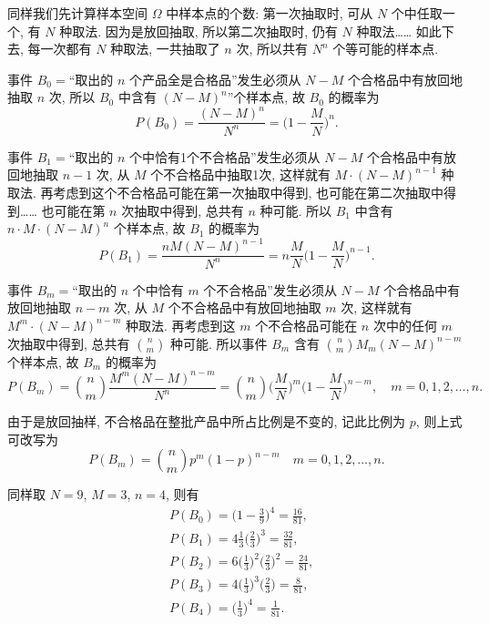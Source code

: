 \begin{solution}
  同样我们先计算样本空间 $\Omega$ 中样本点的个数:
  第一次抽取时,
  可从 $N$ 个中任取一个,
  有 $N$ 种取法.
  因为是放回抽取,
  所以第二次抽取时,
  仍有 $N$ 种取法……
  如此下去,
  每一次都有 $N$ 种取法,
  一共抽取了 $n$ 次,
  所以共有 $N ^n$ 个等可能的样本点.

  事件 $B _0=$“取出的 $n$ 个产品全是合格品”发生必须从 $N - M$ 个合格品中有放回地抽取 $n$ 次,
  所以 $B _0$ 中含有 $(N - M) ^n$”个样本点,
  故 $B _0$ 的概率为
  \[
    P ( B _0 ) = \frac{(N - M)^n}{N ^n} = \biggl( 1 - \frac{M}{N} \biggr) ^n.
  \]

  事件 $B _1=$“取出的 $n$ 个中恰有1个不合格品”发生必须从 $N - M$ 个合格品中有放回地抽取 $n - 1$ 次,
  从 $M$ 个不合格品中抽取1次,
  这样就有 $M \cdot (N - M) ^{n - 1}$ 种取法.
  再考虑到这个不合格品可能在第一次抽取中得到,
  也可能在第二次抽取中得到……
  也可能在第 $n$ 次抽取中得到,
  总共有 $n$ 种可能.
  所以 $B _1$ 中含有 $n \cdot M \cdot (N - M) ^n$ 个样本点,
  故 $B _1$ 的概率为
  \[
    P (B _1) = \frac{nM (N - M) ^{n - 1}}{N ^n} = n \frac{M}{N} \biggl( 1 - \frac{M}{N} \biggr) ^{n - 1}.
  \]

  事件 $B _m =$“取出的 $n$ 个中恰有 $m$ 个不合格品”发生必须从 $N - M$ 个合格品中有放回地抽取 $n - m$ 次,
  从 $M$ 个不合格品中有放回地抽取 $m$ 次,
  这样就有 $M^m \cdot (N - M) ^{n - m}$ 种取法.
  再考虑到这 $m$ 个不合格品可能在 $n$ 次中的任何 $m$ 次抽取中得到,
  总共有 $\binom{n}{m}$ 种可能.
  所以事件 $B _m$ 含有 $\binom{n}{m} M _m (N - M) ^{n - m}$ 个样本点,
  故 $B _m$ 的概率为
  \begin{equation}
    P (B _m) = \binom{n}{m} \frac{M ^m (N - M)^{n - m}}{N ^n}
    = \binom{n}{m} \biggl( \frac{M}{N} \biggr) ^m \biggl( 1 - \frac{M}{N} \biggr) ^{n - m},
    \quad m = 0, 1, 2, \dotsc, n.\label{eq1.2.7}
  \end{equation}

  由于是放回抽样,
  不合格品在整批产品中所占比例是不变的,
  记此比例为 $p$,
  则上式可改写为
  \[
    P (B _m) = \binom{n}{m} p ^m (1 - p) ^{n - m} \quad m = 0, 1, 2, \dotsc, n.
  \]

  同样取 $N=9$,
  $M=3$,
  $n=4$,
  则有
  \begin{align*}
    & P (B _0) = \biggl(1 - \frac{3}{9} \biggr)^4 = \frac{16}{81},\\
    & P (B _1) = 4 \frac{1}{3} \biggl( \frac{2}{3} \biggr)^3 = \frac{32}{81},\\
    & P (B _2) = 6 \biggl( \frac{1}{3} \biggr) ^2 \biggl( \frac{2}{3} \biggr) ^2 = \frac{24}{81},\\
    & P (B _3) = 4 \biggl( \frac{1}{3} \biggr) ^3 \biggl( \frac{2}{3} \biggr) = \frac{8}{81},\\
    & P (B _4) = \biggl( \frac{1}{3} \biggr) ^4 = \frac{1}{81}.
  \end{align*}


\end{solution}
